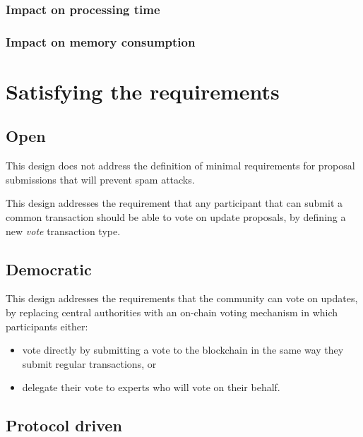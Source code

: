 \documentclass[11pt,a4paper]{article}
\begin{document}
\subsubsection{Impact on processing time}
\label{sec:impact-proc-time}

\subsubsection{Impact on memory consumption}
\label{sec:impact-memory-cons}

\section{Satisfying the requirements}
\label{sec:satisfy-requ}


\subsection{Open}
\label{sec:sat-open}

This design does not address the definition of minimal requirements for proposal
submissions that will prevent spam attacks.

This design addresses the requirement that any participant that can submit a
common transaction should be able to vote on update proposals, by
defining a new \emph{vote} transaction type.

\subsection{Democratic}
\label{sec:sat-decentr-decis-making}

This design addresses the requirements that the community can vote on updates,
by replacing central authorities with an on-chain voting mechanism in which
participants either:
\begin{itemize}
\item vote directly by submitting a vote to the blockchain in the same way they
  submit regular transactions, or
\item delegate their vote to experts who will vote on their behalf.
\end{itemize}

\subsection{Protocol driven}
\label{sec:sat-protocol-driven}
\end{document}
